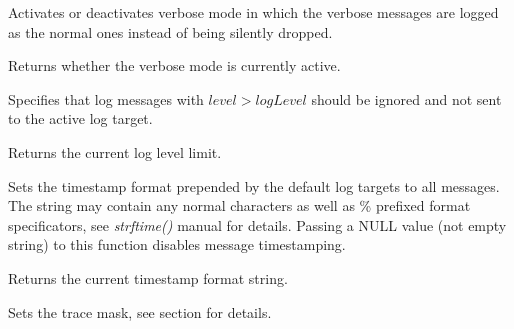 

\label{wxlogsetverbose}


Activates or deactivates verbose mode in which the verbose messages are
logged as the normal ones instead of being silently dropped.

\label{wxloggetverbose}


Returns whether the verbose mode is currently active.

\label{wxlogsetloglevel}


Specifies that log messages with $level > logLevel$ should be ignored
and not sent to the active log target.

\label{wxloggetloglevel}


Returns the current log level limit.

\label{wxlogsettimestamp}


Sets the timestamp format prepended by the default log targets to all
messages. The string may contain any normal characters as well as \%
prefixed format specificators, see {\it strftime()} manual for details.
Passing a NULL value (not empty string) to this function disables message timestamping.

\label{wxloggettimestamp}


Returns the current timestamp format string.

\label{wxlogsettracemask}


Sets the trace mask, see 
section for details.

\label{wxloggettracemask}

